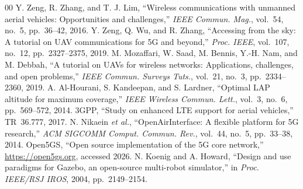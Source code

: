 \documentclass[10pt, conference]{IEEEtran}
\begin{document}
\begin{thebibliography}{00}
 Y. Zeng, R. Zhang, and T. J. Lim, ``Wireless communications with unmanned aerial vehicles: Opportunities and challenges,'' \textit{IEEE Commun. Mag.}, vol.~54, no.~5, pp.~36--42, 2016.
 Y. Zeng, Q. Wu, and R. Zhang, ``Accessing from the sky: A tutorial on UAV communications for 5G and beyond,'' \textit{Proc. IEEE}, vol.~107, no.~12, pp.~2327--2375, 2019.
 M. Mozaffari, W. Saad, M. Bennis, Y.-H. Nam, and M. Debbah, ``A tutorial on UAVs for wireless networks: Applications, challenges, and open problems,'' \textit{IEEE Commun. Surveys Tuts.}, vol.~21, no.~3, pp.~2334--2360, 2019.
 A. Al-Hourani, S. Kandeepan, and S. Lardner, ``Optimal LAP altitude for maximum coverage,'' \textit{IEEE Wireless Commun. Lett.}, vol.~3, no.~6, pp.~569--572, 2014.
 3GPP, ``Study on enhanced LTE support for aerial vehicles,'' TR~36.777, 2017.
 N. Nikaein \textit{et al.}, ``OpenAirInterface: A flexible platform for 5G research,'' \textit{ACM SIGCOMM Comput. Commun. Rev.}, vol.~44, no.~5, pp.~33--38, 2014.
 Open5GS, ``Open source implementation of the 5G core network,'' \url{https://open5gs.org}, accessed 2026.
 N. Koenig and A. Howard, ``Design and use paradigms for Gazebo, an open-source multi-robot simulator,'' in \textit{Proc. IEEE/RSJ IROS}, 2004, pp.~2149--2154.
\end{thebibliography}
\end{document}

